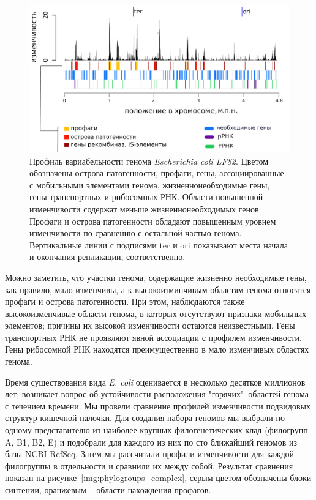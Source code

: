 \begin{figure}[!ht] 
    \center
      \includegraphics[width=\textwidth]{Dissertation/images/complexity/figure5plus.png}
    \caption{Профиль вариабельности генома \textit{Escherichia coli LF82}. Цветом обозначены острова патогенности, профаги,  гены, ассоциированные с мобильными элементами генома, жизненнонеобходимые гены, гены транспортных и рибосомных РНК. Области повышенной изменчивости содержат меньше жизненнонеобходимых генов. Профаги и острова патогенности обладают повышенным уровнем изменчивости по сравнению с остальной частью генома. Вертикальные линии с подписями ter и ori показывают места начала и окончания репликации, соответственно.}
    \label{img:complexity_lf82} 
  \end{figure}

Можно заметить, что участки генома, содержащие жизненно необходимые гены, как правило, мало изменчивы, а к высокоизминчивым областям генома относятся профаги и острова патогенности. При этом, наблюдаются также высокоизменчивые области генома, в которых отсутствуют признаки мобильных элементов; причины их высокой изменчивости остаются неизвестными. Гены транспортных РНК не проявляют явной ассоциации с профилем изменчивости. Гены рибосомной РНК находятся преимущественно в мало изменчивых областях генома. 

Время существования вида \textit{E. coli} оценивается в несколько десятков миллионов лет; возникает вопрос об устойчивости расположения "горячих"\ областей генома с течением времени. Мы провели сравнение профилей изменчивости подвидовых структур кишечной палочки. Для создания набора геномов мы выбрали по одному представителю из наиболее крупных филогенетических клад (филогрупп A, B1, B2, E) и подобрали для каждого из них по сто ближайший геномов из базы NCBI RefSeq. Затем мы рассчитали профили изменчивости для каждой филогруппы в отдельности и сравнили их между собой. Результат сравнения показан на рисунке~\ref{img:phylogroups_complex}, серым цветом обозначены блоки синтении, оранжевым -- области нахождения профагов.    

